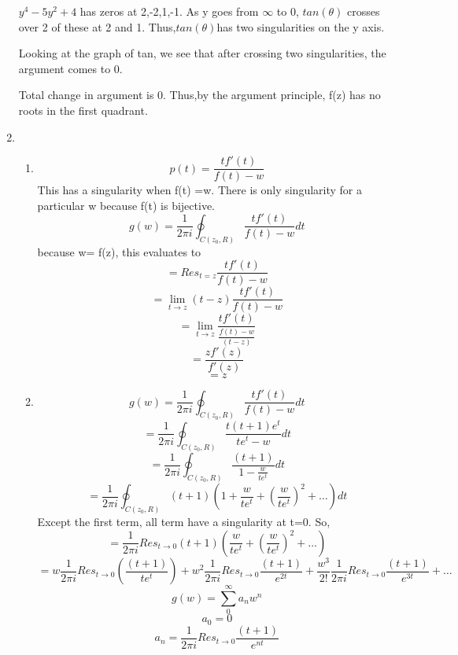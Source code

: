\documentclass[a4paper]{article}
\begin{document}
\begin{enumerate}
$y^4-5y^2+4$ has zeros at 2,-2,1,-1. As y goes from $\infty$ to 0, $tan(\theta)$ crosses over 2 of these at 2 and 1. Thus,$ tan(\theta) $has two singularities on the y axis.
\vspace{50mm}


Looking at the graph of tan, we see that after crossing two singularities, the argument comes to 0.

Total change in argument is 0. Thus,by the argument principle, f(z) has no roots in the first quadrant.
\item
\begin{enumerate}
	
	\item
\[p(t) =\frac{t f'(t)}{f(t)-w} \]
This has a singularity when f(t) =w. There is only singularity for a particular w because f(t) is bijective.
\[g(w)=\frac{1}{2\pi i}\oint_{C(z_0,R)}\frac{t f'(t)}{f(t)-w}dt\]
because w= f(z), this evaluates to 
\[ =Res_{t=z}\frac{t f'(t)}{f(t)-w}\]
\[ =\lim_{t\to z} (t-z)\frac{t f'(t)}{f(t)-w}\]
\[ =\lim_{t\to z} \frac{t f'(t)}{\frac{f(t)-w}{(t-z)}}\]
\[ = \frac{z f'(z)}{f'(z)}\]
\[= z\]
\item
\[g(w)=\frac{1}{2\pi i}\oint_{C(z_0,R)}\frac{t f'(t)}{f(t)-w}dt\]
\[=\frac{1}{2\pi i}\oint_{C(z_0,R)}\frac{t (t+1)e^t}{te^t-w}dt\]
\[=\frac{1}{2\pi i}\oint_{C(z_0,R)}\frac{ (t+1)}{1-\frac{w}{te^t}}dt\]
\[=\frac{1}{2\pi i}\oint_{C(z_0,R)} (t+1)(1+\frac{w}{te^t}+({\frac{w}{te^t}})^2 +\ldots)dt\]
Except the first term, all term have a singularity at t=0. So, 
\[=\frac{1}{2\pi i} Res_{t \to 0} (t+1)(\frac{w}{te^t}+({\frac{w}{te^t}})^2 +\ldots)\]
\[=w\frac{1}{2\pi i} Res_{t \to 0}(\frac{(t+1)}{te^t})+w^2\frac{1}{2\pi i} Res_{t \to 0}{\frac{(t+1)}{e^{2t}}}+\frac{w^3}{2!}\frac{1}{2\pi i} Res_{t \to 0}{\frac{(t+1)}{e^{3t}}}+\ldots\]
\[ g(w)=\sum_{0}^{\infty} a_n w^n\]
\[ a_0 = 0\]
\[ a_n =
\frac{1}{2\pi i} Res_{t \to 0}\frac{(t+1)}{e^{nt}}\]


\end{enumerate}
	\end{enumerate} 
\end{document}
